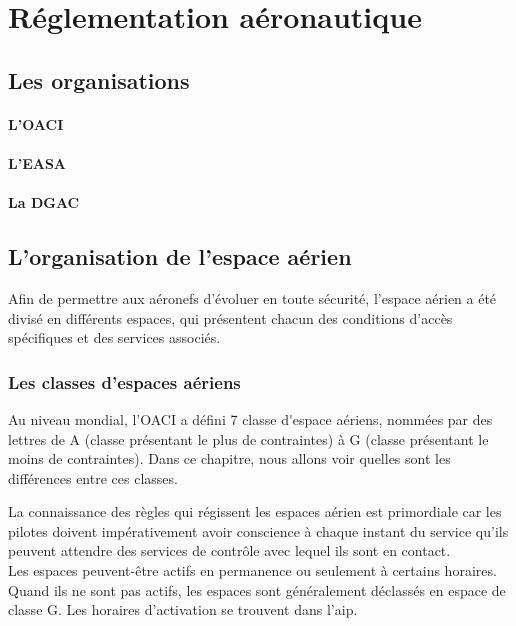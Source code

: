 \section{Réglementation aéronautique}
	\subsection{Les organisations}
		\paragraph{L'OACI}
		
		\paragraph{L'EASA}
		
		\paragraph{La DGAC}
		
			
	
	\subsection{L'organisation de l'espace aérien}
	Afin de permettre aux aéronefs d'évoluer en toute sécurité, l'espace aérien a été divisé en différents espaces, qui présentent chacun des conditions d'accès spécifiques et des services associés.
		
		\subsubsection{Les classes d'espaces aériens}
		Au niveau mondial, l'OACI a défini 7 \glspl{classe d'espace aérien}, nommées par des lettres de A (classe présentant le plus de contraintes) à G (classe présentant le moins de contraintes). Dans ce chapitre, nous allons voir quelles sont les différences entre ces classes.
		
		La connaissance des règles qui régissent les espaces aérien est primordiale car les pilotes doivent impérativement avoir conscience à chaque instant du service qu'ils peuvent attendre des services de contrôle avec lequel ils sont en contact.\\
		
		Les espaces peuvent-être actifs en permanence ou seulement à certains horaires. Quand ils ne sont pas actifs, les espaces sont généralement déclassés en espace de classe G. Les horaires d'activation se trouvent dans l'\acrshort{aip}. \\
		
